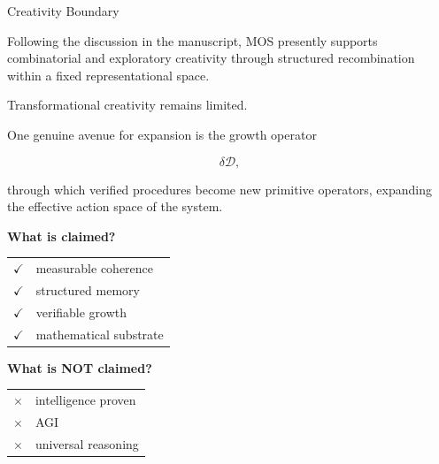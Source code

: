 
\begin{mosbox}{Creativity Boundary}

\BodyFont

Following the discussion in the manuscript, MOS presently supports
combinatorial and exploratory creativity through structured
recombination within a fixed representational space.

Transformational creativity remains limited.

One genuine avenue for expansion is the growth operator

\[
\delta\mathcal D,
\]

through which verified procedures become new primitive operators,
expanding the effective action space of the system.

\end{mosbox}


\begin{tcolorbox}[
  colback=MOSBlack,
  colframe=MOSGold,
  boxrule=4pt,
  arc=4mm,
  boxsep=8mm
]

\centering

{\Huge\bfseries\color{MOSGold} What is claimed?}

\vspace{8mm}
\Large\color{white}
\begin{tabular}{cl}
\textcolor{green!70!black}{\Large $\checkmark$} & \Large measurable coherence \\[4mm]
\textcolor{green!70!black}{\Large $\checkmark$} & \Large structured memory \\[4mm]
\textcolor{green!70!black}{\Large $\checkmark$} & \Large verifiable growth \\[4mm]
\textcolor{green!70!black}{\Large $\checkmark$} & \Large mathematical substrate
\end{tabular}

\vspace{12mm}

{\Huge\bfseries\color{MOSRed} What is NOT claimed?}

\vspace{8mm}
\Large\color{white}
\begin{tabular}{cl}
\textcolor{MOSRed}{\Large $\times$} & \Large intelligence proven \\[4mm]
\textcolor{MOSRed}{\Large $\times$} & \Large AGI \\[4mm]
\textcolor{MOSRed}{\Large $\times$} & \Large universal reasoning
\end{tabular}

\end{tcolorbox}